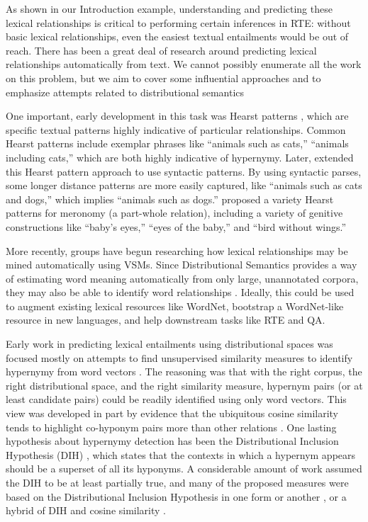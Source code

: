 As shown in our Introduction example, understanding and predicting these
lexical relationships is critical to performing certain inferences in RTE:
without basic lexical relationships, even the easiest textual entailments would
be out of reach. There has been a great deal of research around predicting
lexical relationships automatically from text. We cannot possibly enumerate all
the work on this problem, but we aim to cover some influential approaches and
to emphasize attempts related to distributional semantics

One important, early development in this task was Hearst patterns
\cite{hearst:1992:coling}, which are specific textual patterns highly
indicative of particular relationships. Common Hearst patterns include
exemplar phrases like ``animals such as cats,'' ``animals including cats,'' which are both highly
indicative of hypernymy. Later,
 extended this Hearst pattern approach
to use syntactic patterns. By using syntactic parses, some longer distance patterns
are more easily captured, like ``animals such as cats and dogs,'' which implies
``animals such as dogs.''
 proposed a variety Hearst patterns for meronomy (a
part-whole relation), including a variety of genitive constructions like
``baby's eyes,'' ``eyes of the baby,'' and ``bird without wings.''

More recently, groups have begun researching how lexical relationships may be
mined automatically using VSMs. Since Distributional
Semantics provides a way of estimating word meaning automatically from only
large, unannotated corpora, they may also be able to identify
word relationships \cite{baroni:2011:gems,baroni:2012:eacl}. Ideally, this
could be used to augment existing lexical resources like WordNet, bootstrap
a WordNet-like resource in new languages, and help downstream tasks like RTE
and QA.

Early work in predicting lexical entailments using distributional spaces was
focused mostly on attempts to find unsupervised similarity measures to identify
hypernymy from word vectors
\cite{weeds:2004:coling,clarke:2009:gems,kotlerman:2010:nle,lenci:2012:starsem,santus:2013:thesis}.
The reasoning was that with the right corpus, the right
distributional space, and the right similarity measure, hypernym pairs
(or at least candidate pairs) could be readily identified using only word
vectors. This view was developed in part by evidence that the ubiquitous
cosine similarity tends to highlight co-hyponym pairs more than other relations
\cite{weeds:2004:coling,baroni:2011:gems}.  One lasting hypothesis about
hypernymy detection has been the Distributional Inclusion Hypothesis (DIH)
\cite{zhitomirskygeffet:2005:acl}, which states that the contexts in which a
hypernym appears should be a superset of all its hyponyms. A considerable
amount of work assumed the DIH to be at least partially true, and many of the
proposed measures were based on the Distributional Inclusion Hypothesis in one
form or another \cite{clarke:2009:gems}, or a hybrid of DIH and cosine
similarity \cite{kotlerman:2010:nle,lenci:2012:starsem}.

